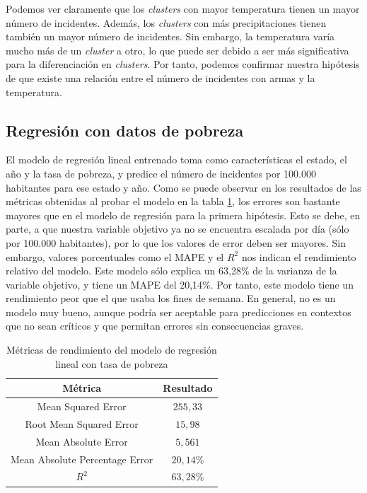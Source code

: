 \documentclass[11pt,a4paper]{article}
\begin{document}
Podemos ver claramente que los \textit{clusters} con mayor temperatura tienen un mayor número de incidentes. Además, los \textit{clusters} con más precipitaciones tienen también un mayor número de incidentes. Sin embargo, la temperatura varía mucho más de un \textit{cluster} a otro, lo que puede ser debido a ser más significativa para la diferenciación en \textit{clusters}. Por tanto, podemos confirmar nuestra hipótesis de que existe una relación entre el número de incidentes con armas y la temperatura.

\subsection{Regresión con datos de pobreza}

El modelo de regresión lineal entrenado toma como características el estado, el año y la tasa de pobreza, y predice el número de incidentes por 100.000 habitantes para ese estado y año. Como se puede observar en los resultados de las métricas obtenidas al probar el modelo en la tabla \ref{tab:met_reg_pob}, los errores son bastante mayores que en el modelo de regresión para la primera hipótesis. Esto se debe, en parte, a que nuestra variable objetivo ya no se encuentra escalada por día (sólo por 100.000 habitantes), por lo que los valores de error deben ser mayores. Sin embargo, valores porcentuales como el MAPE y el $R^2$ nos indican el rendimiento relativo del modelo. Este modelo sólo explica un 63,28\% de la varianza de la variable objetivo, y tiene un MAPE del 20,14\%. Por tanto, este modelo tiene un rendimiento peor que el que usaba los fines de semana. En general, no es un modelo muy bueno, aunque podría ser aceptable para predicciones en contextos que no sean críticos y que permitan errores sin consecuencias graves.

\begin{table}[H]
    \centering
    \begin{tabular}{|c|c|}
        \hline
        \textbf{Métrica} & \textbf{Resultado} \\
        \hline
        Mean Squared Error & $255,33$ \\
        \hline
        Root Mean Squared Error & $15,98$ \\
        \hline
        Mean Absolute Error & $5,561$ \\
        \hline
        Mean Absolute Percentage Error & $20,14\%$ \\
        \hline
        $R^2$ & $63,28\%$ \\
        \hline
    \end{tabular}
    \caption{Métricas de rendimiento del modelo de regresión lineal con tasa de pobreza}
    \label{tab:met_reg_pob}
\end{table}
\end{document}
